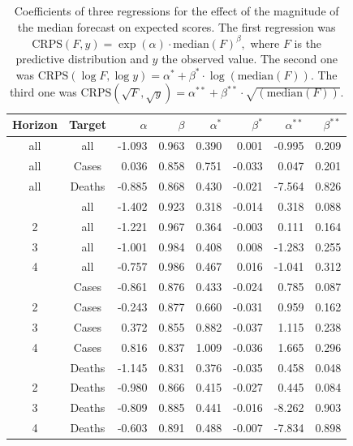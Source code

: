 \documentclass{article}
\begin{document}
\begin{table}
\centering
\begin{tabular}{ccrrrrrr}
\toprule
Horizon & Target & $\alpha$ & $\beta$ & $\alpha^*$ & $\beta^*$ & $\alpha^{**}$ & $\beta^{**}$\\
\midrule
all & all & -1.093 & 0.963 & 0.390 & 0.001 & -0.995 & 0.209\\
\addlinespace
all & Cases & 0.036 & 0.858 & 0.751 & -0.033 & 0.047 & 0.201\\
all & Deaths & -0.885 & 0.868 & 0.430 & -0.021 & -7.564 & 0.826\\
\addlinespace
1 & all & -1.402 & 0.923 & 0.318 & -0.014 & 0.318 & 0.088\\
2 & all & -1.221 & 0.967 & 0.364 & -0.003 & 0.111 & 0.164\\
3 & all & -1.001 & 0.984 & 0.408 & 0.008 & -1.283 & 0.255\\
4 & all & -0.757 & 0.986 & 0.467 & 0.016 & -1.041 & 0.312\\
\addlinespace
1 & Cases & -0.861 & 0.876 & 0.433 & -0.024 & 0.785 & 0.087\\
2 & Cases & -0.243 & 0.877 & 0.660 & -0.031 & 0.959 & 0.162\\
3 & Cases & 0.372 & 0.855 & 0.882 & -0.037 & 1.115 & 0.238\\
4 & Cases & 0.816 & 0.837 & 1.009 & -0.036 & 1.665 & 0.296\\
\addlinespace
1 & Deaths & -1.145 & 0.831 & 0.376 & -0.035 & 0.458 & 0.048\\
2 & Deaths & -0.980 & 0.866 & 0.415 & -0.027 & 0.445 & 0.084\\
3 & Deaths & -0.809 & 0.885 & 0.441 & -0.016 & -8.262 & 0.903\\
4 & Deaths & -0.603 & 0.891 & 0.488 & -0.007 & -7.834 & 0.898\\
\bottomrule
\end{tabular}
\caption{Coefficients of three regressions for the effect of the magnitude of the median forecast on expected scores. The first regression was 
$\text{CRPS}(F, y) = \exp(\alpha) \cdot \text{median}(F)^{\beta},$ where $F$ is the predictive distribution and $y$ the observed value. The second one was 
$\text{CRPS}(\log F, \log y) = \alpha^* + \beta^* \cdot \log{(\text{median}(F))}.$ The third one was $\text{CRPS}(\sqrt{F}, \sqrt{y}) = \alpha^{**} + \beta^{**} \cdot \sqrt{(\text{median}(F))}.$
}
\label{tab:HUB-regression}
\end{table}




\clearpage

\end{document}
